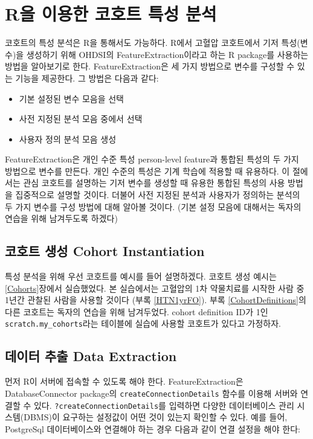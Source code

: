 \documentclass[10.5pt]{book}
\providecommand{\tightlist}{%
  \setlength{\itemsep}{0pt}\setlength{\parskip}{0pt}}
\theoremstyle{definition}
\theoremstyle{definition}
\theoremstyle{definition}
\theoremstyle{remark}
\begin{document}
\section{R을 이용한 코호트 특성 분석}\label{r----}

코호트의 특성 분석은 R을 통해서도 가능하다. R에서 고혈압 코호트에서 기저
특성(변수)을 생성하기 위해 OHDSI의 FeatureExtraction이라고 하는 R
package를 사용하는 방법을 알아보기로 한다. FeatureExtraction은 세 가지
방법으로 변수를 구성할 수 있는 기능을 제공한다. 그 방법은 다음과 같다:

\begin{itemize}
\tightlist
\item
  기본 설정된 변수 모음을 선택
\item
  사전 지정된 분석 모음 중에서 선택
\item
  사용자 정의 분석 모음 생성
\end{itemize}

FeatureExtraction은 개인 수준 특성 person-level feature과 통합된 특성의
두 가지 방법으로 변수를 만든다. 개인 수준의 특성은 기계 학습에 적용할 때
유용하다. 이 절에서는 관심 코호트를 설명하는 기저 변수를 생성할 때
유용한 통합된 특성의 사용 방법을 집중적으로 설명할 것이다. 더불어 사전
지정된 분석과 사용자가 정의하는 분석의 두 가지 변수를 구성 방법에 대해
알아볼 것이다. (기본 설정 모음에 대해서는 독자의 연습을 위해 남겨두도록
하겠다)

\subsection{코호트 생성 Cohort
Instantiation}\label{--cohort-instantiation}

특성 분석을 위해 우선 코호트를 예시를 들어 설명하겠다. 코호트 생성
예시는 \ref{Cohorts}장에서 실습했었다. 본 실습에서는 고혈압의 1차
약물치료를 시작한 사람 중 1년간 관찰된 사람을 사용할 것이다 (부록
\ref{HTN1yrFO}). 부록 \ref{CohortDefinitions}의 다른 코호트는 독자의
연습을 위해 남겨두었다. cohort definition ID가 1인
\texttt{scratch.my\_cohorts}라는 테이블에 실습에 사용할 코호트가 있다고
가정하자.

\subsection{데이터 추출 Data Extraction}\label{--data-extraction}

먼저 R이 서버에 접속할 수 있도록 해야 한다. FeatureExtraction은
DatabaseConnector package의 \texttt{createConnectionDetails} 함수를
이용해 서버와 연결할 수 있다. \texttt{?createConnectionDetails}를
입력하면 다양한 데이터베이스 관리 시스템(DBMS)이 요구하는 설정값이 어떤
것이 있는지 확인할 수 있다. 예를 들어, PostgreSql 데이터베이스와
연결해야 하는 경우 다음과 같이 연결 설정을 해야 한다:
\end{document}
